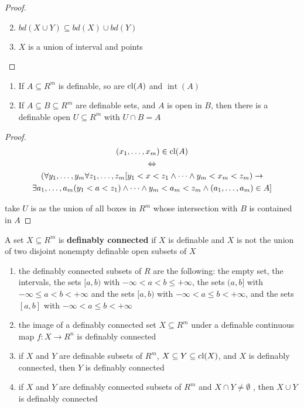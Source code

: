 \documentclass[11pt]{article}
\DeclareMathOperator{\tint}{\text{int}}
\begin{document}
\begin{proof}
\begin{enumerate}
\setcounter{enumi}{1}
\item \(bd(X\cup Y)\subseteq bd(X)\cup bd(Y)\)
\item \(X\) is a union of interval and points
\end{enumerate}
\end{proof}

\begin{lemma}[]
\begin{enumerate}
\item If \(A\subseteq R^m\) is definable, so are \(\operatorname{\text{cl}}(A)\) and \(\tint(A)\)
\item If \(A\subseteq B\subseteq R^m\) are definable sets, and \(A\) is open in \(B\), then there is a definable
open \(U\subseteq R^m\) with \(U\cap B=A\)
\end{enumerate}
\end{lemma}

\begin{proof}
\begin{gather*}
(x_1,\dots,x_m)\in\operatorname{\text{cl}}(A)\\
\Leftrightarrow\\
(\forall y_1,\dots,y_m\forall z_1,\dots,z_m[y_1<x<z_1\wedge\dots\wedge y_m<x_m<z_m)\to\\
\exists a_1,\dots,a_m(y_1<a<z_1)\wedge\dots\wedge y_m<a_m<z_m\wedge(a_1,\dots,a_m)\in A]
\end{gather*}

take \(U\) is as the union of all boxes in \(R^m\)  whose intersection with \(B\) is contained in \(A\)
\end{proof}

\begin{definition}[]
A set \(X\subseteq R^m\) is \textbf{definably connected} if \(X\) is definable and \(X\) is not the union of two
disjoint nonempty definable open subsets of \(X\)
\end{definition}

\begin{lemma}[]
\label{1.3.6}
\begin{enumerate}
\item the definably connected subsets of \(R\) are the following: the empty set, the intervals, the
sets \([a,b)\) with \(-\infty<a<b\le+\infty\), the sets \((a,b]\) with \(-\infty\le a<b<+\infty\) and the sets
\([a,b)\) with \(-\infty<a\le b<+\infty\), and the sets \([a,b]\) with \(-\infty<a\le b<+\infty\)
\item the image of a definably connected set \(X\subseteq R^m\) under a definable continuous map \(f:X\to R^n\)
is definably connected
\item if \(X\) and \(Y\) are definable subsets of \(R^m\), \(X\subseteq Y\subseteq\operatorname{\text{cl}}(X)\), and \(X\) is definably
connected, then \(Y\) is definably connected
\item if \(X\) and \(Y\) are definably connected subsets of \(R^m\) and \(X\cap Y\neq\emptyset\) , then \(X\cup Y\)
is definably connected
\end{enumerate}
\end{lemma}
\end{document}
